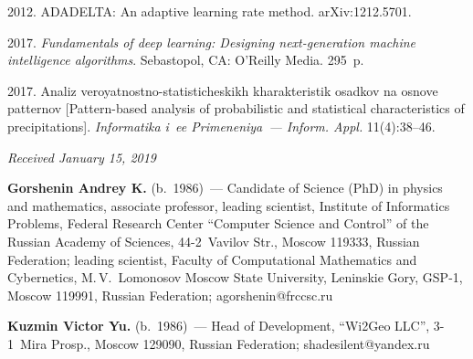 \begin{multicols}{2}
{{\begin{thebibliography}{99}
 2012. ADADELTA: An adaptive learning rate method. arXiv:1212.5701.

 2017. \textit{Fundamentals of deep learning: Designing 
 next-generation machine intelligence algorithms}. Sebastopol, CA: O'Reilly Media.
 295~p.

 2017. Analiz veroyatnostno-statisticheskikh kharakteristik osadkov na 
 osnove patternov [Pattern-based analysis of probabilistic and statistical 
 characteristics of precipitations]. \textit{Informatika i~ee Primeneniya~---
  Inform. Appl.} 11(4):38--46.
  \end{thebibliography}

 }
 }

\end{multicols}

\vspace*{-6pt}

\hfill{\small\textit{Received January 15, 2019}}



\Contr

\noindent
\textbf{Gorshenin Andrey K.} (b.\ 1986)~--- Candidate of Science (PhD) in physics and
mathematics, associate professor, leading scientist, Institute of Informatics Problems,
Federal Research Center ``Computer Science and Control'' of the Russian Academy of
Sciences, 44-2~Vavilov Str., Moscow 119333, Russian Federation;  leading scientist, 
Faculty of Computational Mathematics and Cybernetics, 
M.\,V.~Lomonosov Moscow State University, 
Leninskie Gory, GSP-1, Moscow 119991, Russian Federation; \mbox{agorshenin@frccsc.ru}

\vspace*{3pt}

\noindent
\textbf{Kuzmin Victor Yu.} (b.\ 1986)~--- Head of Development, 
``Wi2Geo LLC'', 3-1~Mira Prosp., Moscow 129090, Russian Federation; 
\mbox{shadesilent@yandex.ru}
\label{end\stat}

\renewcommand{\bibname}{\protect\rm Литература}       